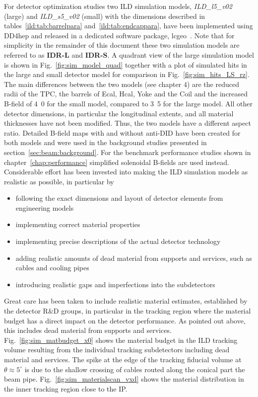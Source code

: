 For detector optimization studies two ILD simulation models, \emph{ ILD\_l5\_v02} (large)
and \emph{ ILD\_s5\_v02} (small) with the dimensions described in tables~\ref{ild:tab:barrelpara} and~\ref{ild:tab:endcappara},
have been implemented using DD4hep and released in a dedicated software package, lcgeo~\cite{bib:lcgeo}.
Note that for simplicity in the remainder of this document these two simulation models are referred to as \textbf{IDR-L} and \textbf{IDR-S}.
A quadrant view of the large simulation model is shown in Fig.~\ref{fig:sim_model_quad} together with a plot of simulated
hits in the large and small detector model for comparison in Fig.~\ref{fig:sim_hits_LS_rz}. The main differences between the two models (see chapter 4) are the reduced radii of
the TPC, the barrels of Ecal, Hcal, Yoke and the Coil and the increased B-field of \unit{4.0}{\tesla} for the small model,
compared to \unit{3.5}{\tesla} for the large model.
All other detector dimensions, in particular the longitudinal extents, and all material thicknesses have not been modified.
Thus, the two models have a different aspect ratio.
Detailed B-field maps with and without anti-DID have been created for both models and were used in the background studies presented in
section~\ref{sec:beam:background}. For the benchmark performance studies shown in chapter~\ref{chap:performance}
simplified solenoidal B-fields are used instead.
%
Considerable effort has been invested into making the ILD simulation models as realistic as possible, in particular by
\begin{itemize}
\item following the exact dimensions and layout of detector elements from engineering models
\item implementing correct material properties
\item implementing precise descriptions of the actual detector technology
\item adding realistic amounts of dead material from supports and services, such as cables and cooling pipes
\item introducing realistic gaps and imperfections into the subdetectors
\end{itemize}
Great care has been taken to include realistic material estimates, established by the detector R\&D groups,
in particular in the tracking region where the material budget has a direct impact on the detector performance.
As pointed out above, this includes dead material from supports and services.
Fig.~\ref{fig:sim_matbudget_x0} shows the  material budget in the ILD tracking volume resulting from the
individual tracking subdetectors including dead material and services. The spike at the edge of the tracking
fiducial volume at $\theta \approx 5^{\circ}$ is due to the shallow crossing of cables routed along the
conical part the beam pipe. Fig.~\ref{fig:sim_materialscan_vxd} shows the material distribution in the
inner tracking region close to the IP.

